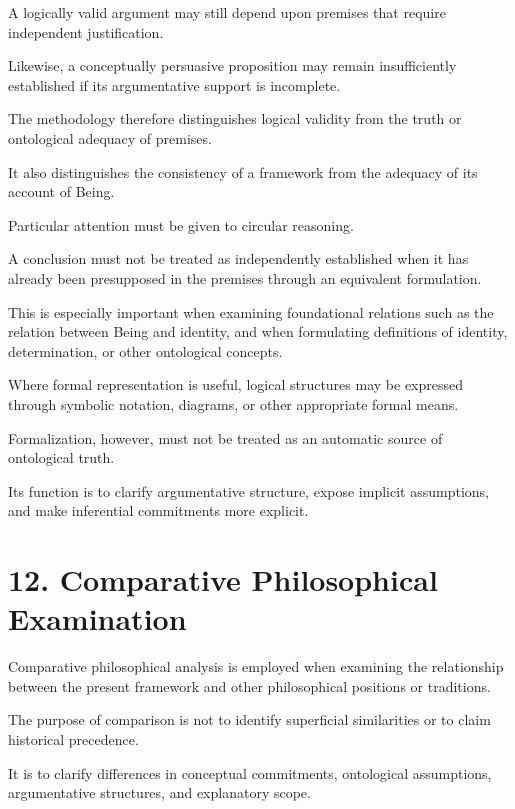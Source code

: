 A logically valid argument may
still depend upon premises that
require independent justification.

Likewise, a conceptually persuasive
proposition may remain insufficiently
established if its argumentative
support is incomplete.

The methodology therefore
distinguishes logical validity
from the truth or ontological
adequacy of premises.

It also distinguishes the
consistency of a framework
from the adequacy of its account
of Being.

Particular attention must be
given to circular reasoning.

A conclusion must not be treated
as independently established
when it has already been
presupposed in the premises
through an equivalent formulation.

This is especially important
when examining foundational
relations such as the relation
between Being and identity,
and when formulating definitions
of identity, determination,
or other ontological concepts.

Where formal representation
is useful, logical structures
may be expressed through
symbolic notation, diagrams,
or other appropriate formal
means.

Formalization, however, must
not be treated as an automatic
source of ontological truth.

Its function is to clarify
argumentative structure, expose
implicit assumptions, and make
inferential commitments more
explicit.


\section*{12. Comparative Philosophical Examination}

Comparative philosophical analysis
is employed when examining the
relationship between the present
framework and other philosophical
positions or traditions.

The purpose of comparison is
not to identify superficial
similarities or to claim historical
precedence.

It is to clarify differences
in conceptual commitments,
ontological assumptions,
argumentative structures, and
explanatory scope.

